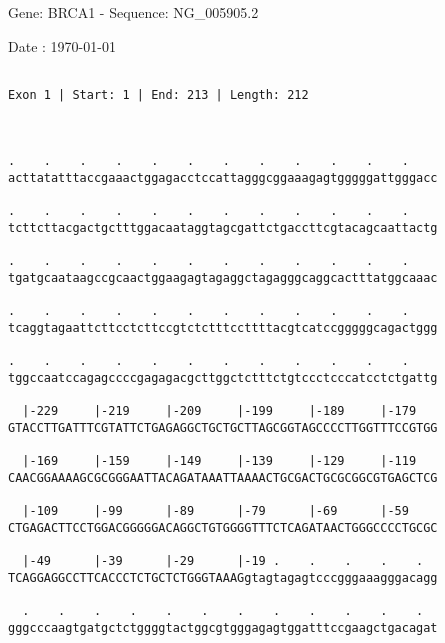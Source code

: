 \documentclass{article}
\begin{document}
\begin{center}
\begin{large}
 Gene: BRCA1 - Sequence: NG\_005905.2
 
 Date : \today
\end{large}
\end{center}
 \begin{Verbatim}
 
Exon 1 | Start: 1 | End: 213 | Length: 212



.    .    .    .    .    .    .    .    .    .    .    .    
acttatatttaccgaaactggagacctccattagggcggaaagagtgggggattgggacc
                                                            
.    .    .    .    .    .    .    .    .    .    .    .    
tcttcttacgactgctttggacaataggtagcgattctgaccttcgtacagcaattactg
                                                            
.    .    .    .    .    .    .    .    .    .    .    .    
tgatgcaataagccgcaactggaagagtagaggctagagggcaggcactttatggcaaac
                                                            
.    .    .    .    .    .    .    .    .    .    .    .    
tcaggtagaattcttcctcttccgtctctttccttttacgtcatccgggggcagactggg
                                                            
.    .    .    .    .    .    .    .    .    .    .    .    
tggccaatccagagccccgagagacgcttggctctttctgtccctcccatcctctgattg
                                                            
  |-229     |-219     |-209     |-199     |-189     |-179   
GTACCTTGATTTCGTATTCTGAGAGGCTGCTGCTTAGCGGTAGCCCCTTGGTTTCCGTGG
                                                            
  |-169     |-159     |-149     |-139     |-129     |-119   
CAACGGAAAAGCGCGGGAATTACAGATAAATTAAAACTGCGACTGCGCGGCGTGAGCTCG
                                                            
  |-109     |-99      |-89      |-79      |-69      |-59    
CTGAGACTTCCTGGACGGGGGACAGGCTGTGGGGTTTCTCAGATAACTGGGCCCCTGCGC
                                                            
  |-49      |-39      |-29      |-19 .    .    .    .    .  
TCAGGAGGCCTTCACCCTCTGCTCTGGGTAAAGgtagtagagtcccgggaaagggacagg
                                                            
  .    .    .    .    .    .    .    .    .    .    .    .  
gggcccaagtgatgctctggggtactggcgtgggagagtggatttccgaagctgacagat
                                                            

\end{Verbatim}
\end{document}
